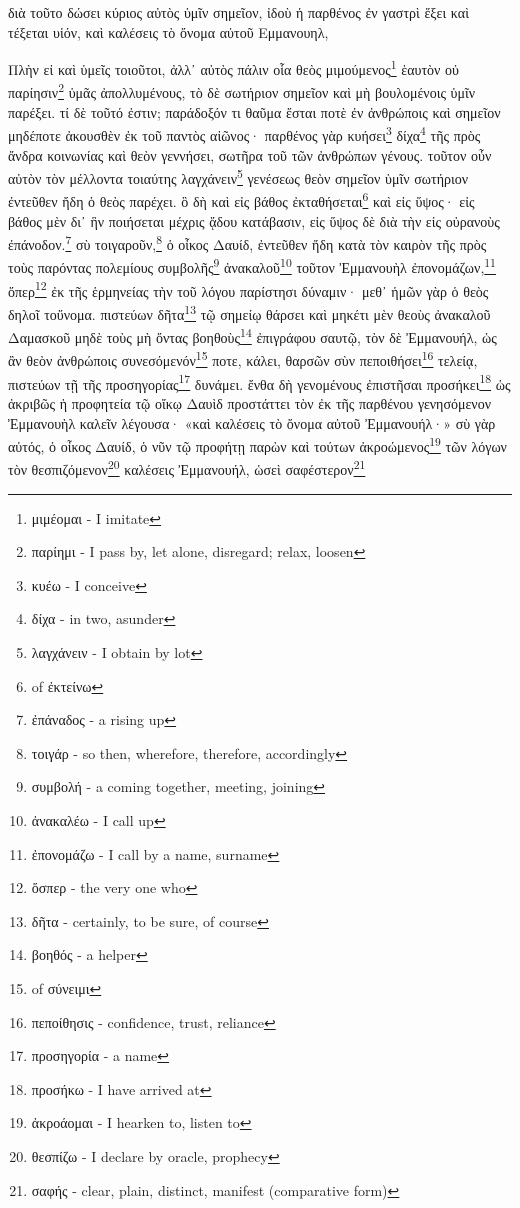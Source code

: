 
διὰ
τοῦτο
δώσει
κύριος
αὐτὸς
ὑμῖν
σημεῖον,
ἰδοὺ
ἡ
παρθένος ἐν
γαστρὶ
ἕξει
καὶ
τέξεται
υἱόν,
καὶ
καλέσεις
τὸ
ὄνομα
αὐτοῦ
Εμμανουηλ,


Πλὴν
εἰ
καὶ
ὑμεῖς
τοιοῦτοι,
ἀλλ᾽
αὐτὸς
πάλιν
οἷα
θεὸς
μιμούμενος\footnote{μιμέομαι - I imitate}
ἑαυτὸν
οὐ
παρίησιν\footnote{παρίημι - I pass by, let alone, disregard; relax, loosen}
ὑμᾶς
ἀπολλυμένους,
τὸ
δὲ
σωτήριον
σημεῖον
καὶ
μὴ
βουλομένοις
ὑμῖν
παρέξει.
τί
δὲ
τοῦτό
ἐστιν;
παράδοξόν
τι
θαῦμα
ἔσται
ποτὲ
ἐν
ἀνθρώποις
καὶ
σημεῖον
μηδέποτε
ἀκουσθὲν
ἐκ
τοῦ
παντὸς
αἰῶνος·
παρθένος
γὰρ
κυήσει\footnote{κυέω - I conceive}
δίχα\footnote{δίχα - in two, asunder}
τῆς
πρὸς
ἄνδρα
κοινωνίας
καὶ
θεὸν
γεννήσει,
σωτῆρα
τοῦ
τῶν
ἀνθρώπων
γένους.
τοῦτον
οὖν
αὐτὸν
τὸν
μέλλοντα
τοιαύτης
λαγχάνειν\footnote{λαγχάνειν - I obtain by lot}
γενέσεως
θεὸν
σημεῖον
ὑμῖν
σωτήριον
ἐντεῦθεν
ἤδη
ὁ
θεὸς
παρέχει.
ὃ
δὴ
καὶ
εἰς
βάθος
ἐκταθήσεται\footnote{ of ἐκτείνω}
καὶ
εἰς
ὕψος·
εἰς
βάθος
μὲν
δι᾽
ἣν
ποιήσεται
μέχρις
ᾅδου
κατάβασιν,
εἰς
ὕψος
δὲ
διὰ
τὴν
εἰς
οὐρανοὺς
ἐπάνοδον.\footnote{ἐπάναδος - a rising up}
σὺ
τοιγαροῦν,\footnote{τοιγάρ - so then, wherefore, therefore, accordingly}
ὁ
οἶκος
Δαυίδ,
ἐντεῦθεν
ἤδη
κατὰ
τὸν
καιρὸν
τῆς
πρὸς
τοὺς
παρόντας
πολεμίους
συμβολῆς\footnote{συμβολή - a coming together, meeting, joining}
ἀνακαλοῦ\footnote{ἀνακαλέω - I call up}
τοῦτον
Ἐμμανουὴλ
ἐπονομάζων,\footnote{ἐπονομάζω - I call by a name, surname}
ὅπερ\footnote{ὅσπερ - the very one who}
ἐκ
τῆς
ἑρμηνείας
τὴν
τοῦ
λόγου
παρίστησι
δύναμιν·
μεθ᾽
ἡμῶν
γὰρ
ὁ
θεὸς
δηλοῖ
τοὔνομα.
πιστεύων
δῆτα\footnote{δῆτα - certainly, to be sure, of course}
τῷ
σημείῳ
θάρσει
καὶ
μηκέτι
μὲν
θεοὺς
ἀνακαλοῦ
Δαμασκοῦ
μηδὲ τοὺς
μὴ
ὄντας
βοηθοὺς\footnote{βοηθός - a helper}
ἐπιγράφου
σαυτῷ,
τὸν
δὲ
Ἐμμανουήλ,
ὡς
ἂν
θεὸν
ἀνθρώποις
συνεσόμενόν\footnote{ of σύνειμι}
ποτε,
κάλει,
θαρσῶν
σὺν
πεποιθήσει\footnote{πεποίθησις - confidence, trust, reliance}
τελείᾳ,
πιστεύων
τῇ
τῆς
προσηγορίας\footnote{προσηγορία - a name}
δυνάμει.
ἔνθα
δὴ
γενομένους
ἐπιστῆσαι
προσήκει\footnote{προσήκω - I have arrived at}
ὡς
ἀκριβῶς
ἡ
προφητεία
τῷ
οἴκῳ
Δαυὶδ
προστάττει
τὸν
ἐκ
τῆς
παρθένου
γενησόμενον
Ἐμμανουὴλ
καλεῖν
λέγουσα·
«καὶ
καλέσεις
τὸ
ὄνομα
αὐτοῦ
Ἐμμανουήλ·»
σὺ
γὰρ
αὐτός,
ὁ
οἶκος
Δαυίδ,
ὁ
νῦν
τῷ
προφήτῃ
παρὼν
καὶ
τούτων
ἀκροώμενος\footnote{ἀκροάομαι - I hearken to, listen to}
τῶν
λόγων
τὸν
θεσπιζόμενον\footnote{θεσπίζω - I declare by oracle, prophecy}
καλέσεις
Ἐμμανουήλ,
ὡσεὶ
σαφέστερον\footnote{σαφής - clear, plain, distinct, manifest (comparative form)}

